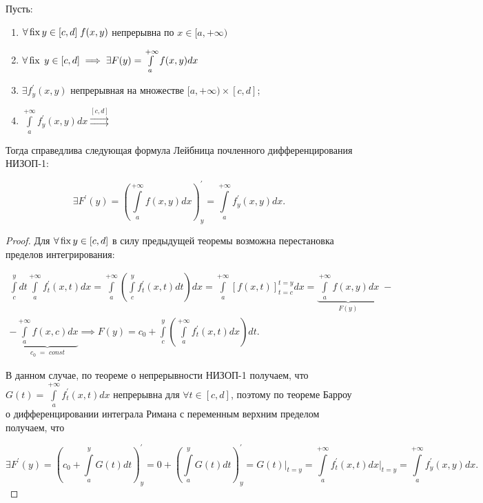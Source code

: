 \documentclass[../../main.tex]{subfiles}
\begin{document}
\begin{thm}
	Пусть: 
	\begin{enumerate}
		\item $\forall \operatorname{fix} y \in [c, d] \; f(x, y)$ непрерывна по $x \in [a, 
		+\infty)$
		\item $\forall \operatorname{fix} \; y \in [c, d] \implies \exists F(y) = 
		\int\limits_a^{+\infty} f(x, y) dx$
		\item $\exists f^{'}_y (x, y)$ непрерывная на множестве $[a, +\infty) \times 
		[c, d]$;
		\item $\displaystyle \int\limits_a^{+\infty} f^{'}_y (x, y) dx 
		\overset{[c, d]}{\rightrightarrows}$
	\end{enumerate}
	Тогда справедлива следующая формула	Лейбница почленного 
	дифференцирования НИЗОП-1:
	
	\begin{equation} \label{lec11:2}
		\exists F^{'}(y) = \left( \int\limits_a^{+\infty} f(x, y) dx \right)^{'}_y = 
		\int\limits_a^{+\infty} f^{'}_y (x, y) dx. 
	\end{equation}
	
	\begin{proof}
		Для $\forall \operatorname{fix} y \in [c, d]$ в силу предыдущей теоремы возможна 
		перестановка пределов интегрирования:
		
		\begin{equation*}
		\begin{gathered}
		\int\limits_c^y dt \int\limits_a^{+\infty} f^{'}_{t}(x, t) dx =
		\int\limits_a^{+\infty} \left( \int\limits_c^y f^{'}_{t} (x, t) dt \right) 
		dx =
		\int\limits_a^{+\infty} \left[ f(x, t) \right]_{t = c}^{t = y} dx
		= \underbrace{\int\limits_a^{+\infty} f(x, y) dx}_{F(y)}\;- \\
		- \underbrace{\int\limits_a^{+\infty} f (x, c) dx}_{c_0\;=\;const} \implies 
		F(y) = c_0 + \int\limits_c^y \left( \int\limits_a^{+\infty} f^{'}_{t} (x, t) 
		dx \right) dt.
		\end{gathered}
		\end{equation*}
		
		В данном случае, по теореме о непрерывности НИЗОП-1 получаем, что $G(t) = 
		\int\limits_a^{+\infty} f_{t}^{'}(x, t) dx$ непрерывна для $\forall t \in 
		[c, d]$, поэтому по теореме Барроу о дифференцировании интеграла Римана с 
		переменным верхним пределом получаем, что
		
		\[
		\exists F^{'}(y) = \left(c_0 + \int\limits_a^y G(t)dt\right)^{'}_y = 0 + 
		\left(\int\limits_a^y G(t)dt\right)^{'}_y = G(t)\bigg|_{t = y} = 
		\int\limits_a^{+\infty} f^{'}_t (x, t) dx\bigg|_{t = y} = 
		\int\limits^{+\infty}_a  f^{'}_y (x, y) dx.
		\]
	\end{proof}
	
\end{thm}
\end{document}
